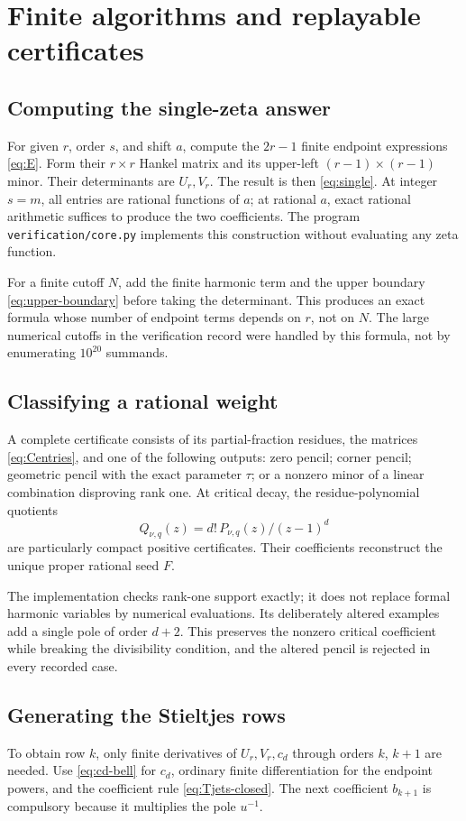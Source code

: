 \section{Finite algorithms and replayable certificates}
\label{app:algorithms}

\subsection{Computing the single-zeta answer}
For given $r$, order $s$, and shift $a$, compute the $2r-1$ finite
endpoint expressions \eqref{eq:E}. Form their $r\times r$ Hankel matrix
and its upper-left $(r-1)\times(r-1)$ minor. Their determinants are
$U_r,V_r$. The result is then \eqref{eq:single}.
At integer $s=m$, all entries are rational functions of $a$; at rational
$a$, exact rational arithmetic suffices to produce the two coefficients.
The program \texttt{verification/core.py} implements this construction
without evaluating any zeta function.

For a finite cutoff $N$, add the finite harmonic term and the upper
boundary \eqref{eq:upper-boundary} before taking the determinant.
This produces an exact formula whose number of endpoint terms depends
on $r$, not on $N$. The large numerical cutoffs in the verification
record were handled by this formula, not by enumerating $10^{20}$
summands.

\subsection{Classifying a rational weight}
A complete certificate consists of its partial-fraction residues, the
matrices \eqref{eq:Centries}, and one of the following outputs:
zero pencil; corner pencil; geometric pencil with the exact parameter
$\tau$; or a nonzero minor of a linear combination disproving rank one.
At critical decay, the residue-polynomial quotients
\[
 Q_{\nu,q}(z)=d!\,P_{\nu,q}(z)/(z-1)^d
\]
are particularly compact positive certificates. Their coefficients
reconstruct the unique proper rational seed $F$.

The implementation checks rank-one support exactly; it does not replace
formal harmonic variables by numerical evaluations. Its deliberately
altered examples add a single pole of order $d+2$. This preserves the
nonzero critical coefficient while breaking the divisibility condition,
and the altered pencil is rejected in every recorded case.

\subsection{Generating the Stieltjes rows}
To obtain row $k$, only finite derivatives of $U_r,V_r,c_d$ through
orders $k$, $k+1$ are needed. Use \eqref{eq:cd-bell} for $c_d$,
ordinary finite differentiation for the endpoint powers, and the
coefficient rule \eqref{eq:Tjets-closed}. The next coefficient $b_{k+1}$
is compulsory because it multiplies the pole $u^{-1}$.

